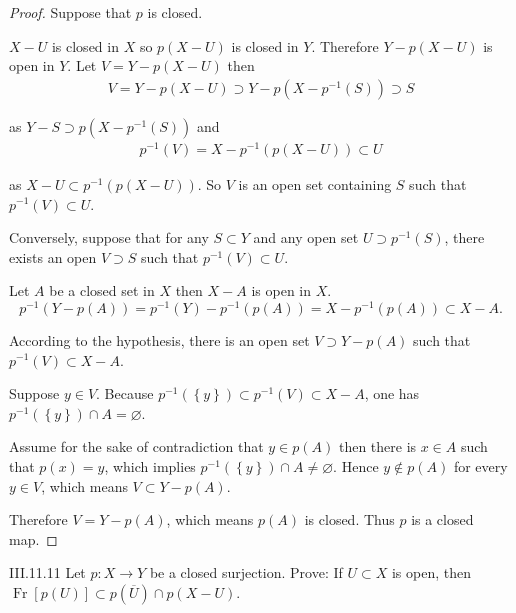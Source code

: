 \begin{proof}
	Suppose that \( p \) is closed.

	\( X - U \) is closed in \(X\) so \( p(X - U) \) is closed in \( Y \). Therefore \( Y - p(X - U) \) is open in \( Y \). Let \( V = Y - p(X - U) \) then
	\begingroup
	\allowdisplaybreaks%
	\begin{align*}
		V = Y - p(X - U) \supset Y - p(X - p^{-1}(S)) \supset S
	\end{align*}
	\endgroup

	as \( Y - S \supset p(X - p^{-1}(S)) \) and
	\begingroup
	\allowdisplaybreaks%
	\begin{align*}
		p^{-1}(V) = X - p^{-1}(p(X - U)) \subset U
	\end{align*}
	\endgroup

	as \( X - U \subset p^{-1}(p(X - U)) \). So \( V \) is an open set containing \( S \) such that \( p^{-1}(V) \subset U \).

	Conversely, suppose that for any \( S \subset Y \) and any open set \( U \supset p^{-1}(S) \), there exists an open \( V \supset S \) such that \( p^{-1}(V) \subset U \).

	Let \( A \) be a closed set in \( X \) then \( X - A \) is open in \( X \).
	\[
		p^{-1}(Y - p(A)) = p^{-1}(Y) - p^{-1}(p(A)) = X - p^{-1}(p(A)) \subset X - A.
	\]

	According to the hypothesis, there is an open set \( V \supset Y - p(A) \) such that \( p^{-1}(V) \subset X - A \).

	Suppose \( y \in V \). Because \( p^{-1}(\left\{ y \right\}) \subset p^{-1}(V) \subset X - A \), one has \( p^{-1}(\left\{ y \right\}) \cap A = \varnothing \).

	Assume for the sake of contradiction that \( y \in p(A) \) then there is \( x \in A \) such that \( p(x) = y \), which implies \( p^{-1}(\left\{ y \right\}) \cap A \ne \varnothing \). Hence \( y \notin p(A) \) for every \( y \in V \), which means \( V \subset Y - p(A) \).

	Therefore \( V = Y - p(A) \), which means \( p(A) \) is closed. Thus \( p \) is a closed map.
\end{proof}

\begin{problem}{III.11.11}
Let \( p: X \to Y \) be a closed surjection. Prove: If \( U \subset X \) is open, then \( \operatorname{Fr}[p(U)] \subset p(\overline{U}) \cap p(X - U) \).
\end{problem}

